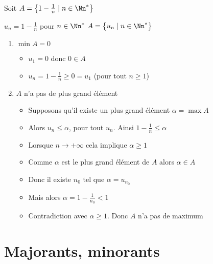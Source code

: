 \begin{frame}
\begin{exemple}
Soit $A=\big\{ 1-\frac{1}{n} \mid n\in \Nn^* \big\}$
 
\pause

 \qquad $u_n=1-\frac{1}{n}$ pour $n\in \Nn^* $ \qquad $A=\big\{ u_n \mid n\in \Nn^* \big\}$
\pause
\vspace*{-1ex}
\vspace*{-4ex}
\pause
\begin{enumerate}
  \item $\min A=0$ 
\pause
  \begin{itemize}
    \item $u_1=0$ donc $0 \in A$
\pause
    \item $u_n =1-\frac{1}{n}\ge 0=u_1$ (pour tout $n\ge 1$)
  \end{itemize}
\pause
  \item $A$ n'a pas de plus grand élément
  \begin{itemize}
\pause
    \item Supposons qu'il existe un plus grand élément $\alpha=\max A$
\pause
    \item Alors $u_n \le \alpha$, pour tout $u_n$. Ainsi $1-\frac{1}{n} \le \alpha$
\pause
    \item Lorsque $n \to +\infty$ cela implique $\alpha \ge 1$
\pause
    \item Comme $\alpha$ est le plus grand élément de $A$ alors $\alpha \in A$
\pause
    \item Donc il existe $n_0$ tel que $\alpha = u_{n_0}$
\pause
    \item Mais alors $\alpha = 1-\frac{1}{n_0} <1$
\pause
    \item Contradiction avec $\alpha \ge 1$. Donc $A$ n'a pas de maximum
  \end{itemize}
\end{enumerate}
\end{exemple}

\end{frame}


\section*{Majorants, minorants}

